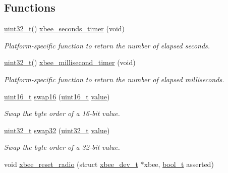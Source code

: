 \subsection*{Functions}
\begin{DoxyCompactItemize}
\item 
\hyperlink{group__hal__dos_ga09a1e304d66d35dd47daffee9731edaa}{uint32\+\_\+t}() \hyperlink{group__hal__hcs08_ga68237f552f0e9a1d548516af35cacbc9}{xbee\+\_\+seconds\+\_\+timer} (void)
\begin{DoxyCompactList}\small\item\em Platform-\/specific function to return the number of elapsed seconds. \end{DoxyCompactList}\item 
\hyperlink{group__hal__dos_ga09a1e304d66d35dd47daffee9731edaa}{uint32\+\_\+t}() \hyperlink{group__hal__hcs08_ga22b4e3df788254ca5f8530e9aee58515}{xbee\+\_\+millisecond\+\_\+timer} (void)
\begin{DoxyCompactList}\small\item\em Platform-\/specific function to return the number of elapsed milliseconds. \end{DoxyCompactList}\item 
\hyperlink{group__hal__dos_ga5a8b2dc9e45a9ee81a94ef304fb62505}{uint16\+\_\+t} \hyperlink{group__hal__hcs08_ga490209526172903494641bdac55db46e}{swap16} (\hyperlink{group__hal__dos_ga5a8b2dc9e45a9ee81a94ef304fb62505}{uint16\+\_\+t} \hyperlink{group__zcl_ga1ed5b151a90f7e99af8cca2e6875ddf4}{value})
\begin{DoxyCompactList}\small\item\em Swap the byte order of a 16-\/bit value. \end{DoxyCompactList}\item 
\hyperlink{group__hal__dos_ga09a1e304d66d35dd47daffee9731edaa}{uint32\+\_\+t} \hyperlink{group__hal__hcs08_ga5bdbc60a02db00841f567d1ade52f877}{swap32} (\hyperlink{group__hal__dos_ga09a1e304d66d35dd47daffee9731edaa}{uint32\+\_\+t} \hyperlink{group__zcl_ga1ed5b151a90f7e99af8cca2e6875ddf4}{value})
\begin{DoxyCompactList}\small\item\em Swap the byte order of a 32-\/bit value. \end{DoxyCompactList}\item 
\mbox{\label{group__hal__hcs08_ga482f4962318807aab3c24b9f0bf9af82}} 
void \hyperlink{group__hal__hcs08_ga482f4962318807aab3c24b9f0bf9af82}{xbee\+\_\+reset\+\_\+radio} (struct \hyperlink{structxbee__dev__t}{xbee\+\_\+dev\+\_\+t} $\ast$xbee, \hyperlink{group__hal__dos_ga04dd5074964518403bf944f2b240a5f8}{bool\+\_\+t} asserted)

\end{DoxyCompactItemize}
